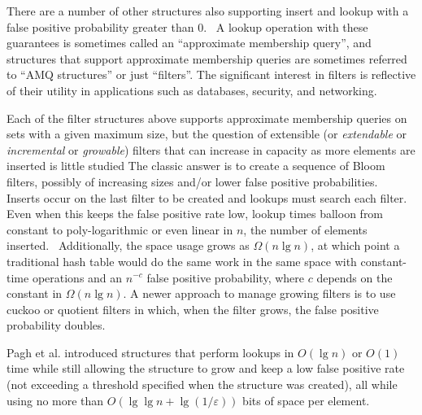 \documentclass[sigconf]{acmart}
\newcommand{\etal}{et al.}
\begin{document}
There are a number of other structures also supporting insert and lookup with a false positive probability greater than 0.~\cite{vacuum,morton-journal,ribbon,xor-filter,quotient-filter,broom,vector-quotient}
A lookup operation with these guarantees is sometimes called an ``approximate membership query'', and structures that support approximate membership queries are sometimes referred to ``AMQ structures'' or just ``filters''.
The significant interest in filters is reflective of their utility in applications such as databases, security, and networking.~\cite{split-bloom, vacuum, quotient-filter, malware, profile-similarity, invertible, flooding-filter, summary-cache, prefix-matching-filter}


Each of the filter structures above supports approximate membership queries on sets with a given maximum size, but the question of extensible (or {\itshape extendable} or {\itshape incremental} or {\itshape growable}) filters that can increase in capacity as more elements are inserted is little studied
The classic answer is to create a sequence of Bloom filters, possibly of increasing sizes and/or lower false positive probabilities.~\cite{dynamic-bloom,scalable-bloom}
Inserts occur on the last filter to be created and lookups must search each filter.
Even when this keeps the false positive rate low, lookup times balloon from constant to poly-logarithmic or even linear in $n$, the number of elements inserted.~\cite{psw,logarithm,consistent-cuckoo} %
Additionally, the space usage grows as $\Omega(n \lg n)$, at which point a traditional hash table would do the same work in the same space with constant-time operations and an $n^{-c}$ false positive probability, where $c$ depends on the constant in $\Omega(n \lg n)$.
A newer approach to manage growing filters is to use cuckoo or quotient filters in which, when the filter grows, the false positive probability doubles.~\cite{logarithm,morton-journal,vacuum,rsqf}


Pagh \etal{} introduced structures that perform lookups in $O(\lg n)$ or $O(1)$ time while still allowing the structure to grow and keep a low false positive rate (not exceeding a threshold specified when the structure was created), all while using no more than $O(\lg \lg n + \lg (1/\varepsilon))$ bits of space per element.~\cite{psw}
\end{document}
